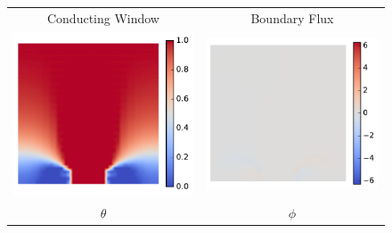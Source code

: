 \documentclass[11pt]{article}
\begin{document}
\begin{figure}[!h]
\begin{tabular}{cc}
         \\
         Conducting Window & Boundary Flux \\
          \includegraphics[scale=.5]{img/singleFlux/theta.pdf}&
         \includegraphics[scale=.5]{img/singleFlux/phi.pdf}
         \\
         $\theta $ & $\phi$ 
    \end{tabular}
\end{figure}
\end{document}
